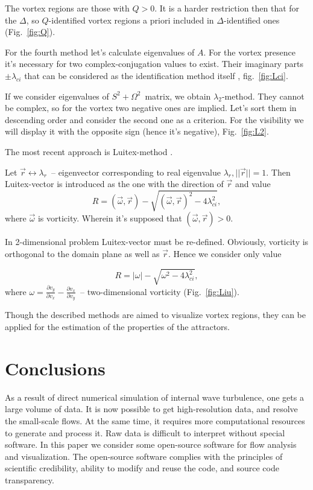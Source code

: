 \documentclass[a4wide,fontsize=12pt]{article}
\begin{document}
The vortex regions are those with $Q>0$. It is a harder restriction then that for the $\Delta$, so $Q$-identified vortex regions a priori included in $\Delta$-identified ones (Fig.~\ref{fig:Q}).

For the fourth method let's calculate eigenvalues of $A$. For the vortex presence it's necessary for two complex-conjugation values to exist. Their imaginary parts $\pm\lambda_{ci}$ that can be considered as the identification method itself \cite{vortex}, fig.~\ref{fig:Lci}.

If we consider eigenvalues of $S^2+\Omega^2$~matrix, we obtain $\lambda_2$-method. They cannot be complex, so for the vortex two negative ones are implied. Let's sort them in descending order and consider the second one as a criterion\cite{vortex,Hussain}. For the visibility we will display it with the opposite sign (hence it's negative), Fig.~\ref{fig:L2}.

The most recent approach is Luitex-method \cite{vortex}.

Let $\vec r \longleftrightarrow \lambda_r$~-- eigenvector corresponding to real eigenvalue $\lambda_r, ||\vec r||=1$. Then Luitex-vector is introduced as the one with the direction of $\vec r$ and value
 $$R=(\vec \omega,\vec r)-\sqrt{(\vec \omega,\vec r)^2-4\lambda_{ci}^2},$$\noindent where $\vec \omega$ is vorticity. Wherein it's supposed that $(\vec \omega,\vec r)>0$.
 
 In 2-dimensional problem Luitex-vector must be re-defined. Obviously, vorticity is orthogonal to the domain plane as well as $\vec r$. Hence we consider only value
 
 $$R=|\omega|- \sqrt{\omega^2-4\lambda_{ci}^2},$$\noindent where $\omega=\frac{\partial v_y}{\partial v_x}-\frac{\partial v_x}{\partial v_y}$~-- two-dimensional vorticity (Fig.~\ref{fig:Liu}).

Though the described methods are aimed to visualize vortex regions, they can be applied for the estimation of the properties of the attractors.

\section{Conclusions}

As a result of direct numerical simulation of internal wave turbulence, one gets a large volume of data. It is now possible to get high-resolution data, and resolve the small-scale flows. At the same time, it requires more computational resources to generate and process it. Raw data is difficult to interpret without special software. In this paper we consider some open-source software for flow analysis and visualization. The open-source software complies with the principles of scientific credibility, ability to modify and reuse the code, and source code transparency.
\end{document}
